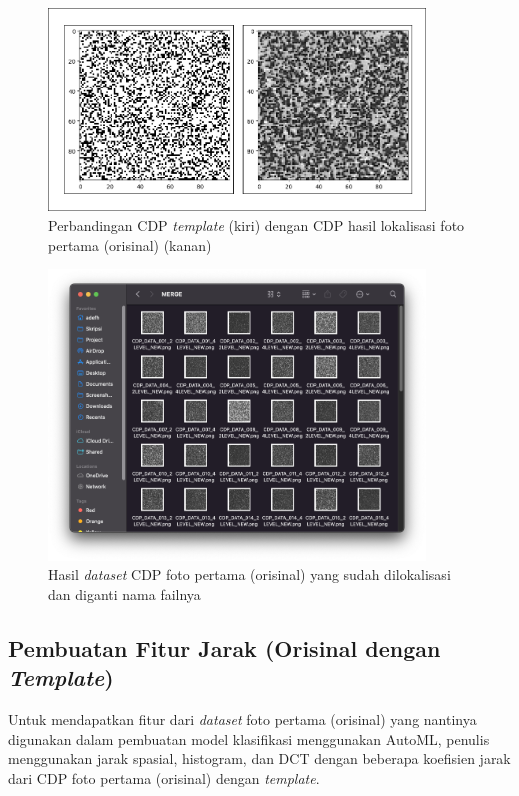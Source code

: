 \begin{figure}[h]
	\centering
	\includegraphics[width=10cm]{contents/chapter-3/3-templatevslokalisasi.png}
	\caption{Perbandingan CDP \emph{template} (kiri) dengan CDP hasil lokalisasi foto pertama (orisinal) (kanan)}
	\label{Fig: 3-templatevslokalisasi}
\end{figure}

\begin{figure}[h]
	\centering
	\includegraphics[width=10cm]{contents/chapter-3/3-hasildatasetcdp.png}
	\caption{Hasil \emph{dataset} CDP foto pertama (orisinal) yang sudah dilokalisasi dan diganti nama failnya}
	\label{Fig: 3-hasildatasetcdp}
\end{figure}

\subsection{Pembuatan Fitur Jarak (Orisinal dengan \emph{Template})} \label{Pembuatan Fitur Jarak {Orisinal dengan Template}}
Untuk mendapatkan fitur dari \emph{dataset} foto pertama (orisinal) yang nantinya digunakan dalam pembuatan model klasifikasi menggunakan AutoML, penulis menggunakan jarak spasial, histogram, dan DCT dengan beberapa koefisien jarak dari CDP foto pertama (orisinal) dengan \emph{template}.

